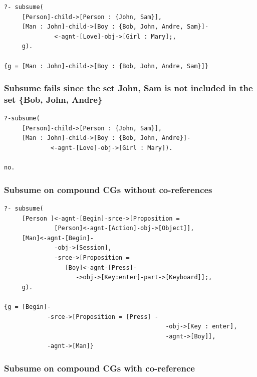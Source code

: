 \documentclass{book}
\begin{document}
\begin{verbatim}
?- subsume(
     [Person]-child->[Person : {John, Sam}],
     [Man : John]-child->[Boy : {Bob, John, Andre, Sam}]-
              <-agnt-[Love]-obj->[Girl : Mary];, 
     g).

{g = [Man : John]-child->[Boy : {Bob, John, Andre, Sam}]}
\end{verbatim}






\subsubsection{Subsume fails since the set {John, Sam} is not included in the set \{Bob, John, Andre\}}



\begin{verbatim}
?-subsume(
     [Person]-child->[Person : {John, Sam}],
     [Man : John]-child->[Boy : {Bob, John, Andre}]-
             <-agnt-[Love]-obj->[Girl : Mary]).

no.
\end{verbatim}





\subsubsection{Subsume on compound CGs without co-references}


\begin{verbatim}
?- subsume(
     [Person ]<-agnt-[Begin]-srce->[Proposition = 
              [Person]<-agnt-[Action]-obj->[Object]],
     [Man]<-agnt-[Begin]-
              -obj->[Session],
              -srce->[Proposition =
                 [Boy]<-agnt-[Press]-
                    ->obj->[Key:enter]-part->[Keyboard]];,
     g).

{g = [Begin]-
            -srce->[Proposition = [Press] -
                                             -obj->[Key : enter],
                                             -agnt->[Boy]],
            -agnt->[Man]}
\end{verbatim}





\subsubsection{Subsume on compound CGs with co-reference}
\end{document}
